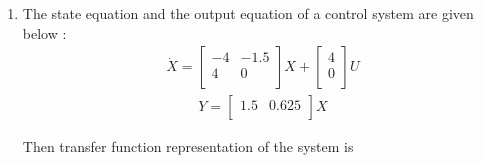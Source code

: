 \begin{enumerate}[label=\thesubsection.\arabic*.,ref=\thesubsection.\theenumi]

\item The state equation and the output equation of a control system are given below : 
\begin{align}
    \dot{X} =
  \left[ {\begin{array}{cc}
   -4 & -1.5 \\
   4 & 0 \\
  \end{array} }\right] X +
  \left[ {\begin{array}{cc}
      4 \\
      0 \\
  \end{array} }\right] U
\end{align}
\begin{align}
    Y = 
 \left[ {\begin{array}{cc}
   1.5 & 0.625 \\
  \end{array} }\right] X
\end{align}
  
Then transfer function representation of the system is 
\\


\end{enumerate}
